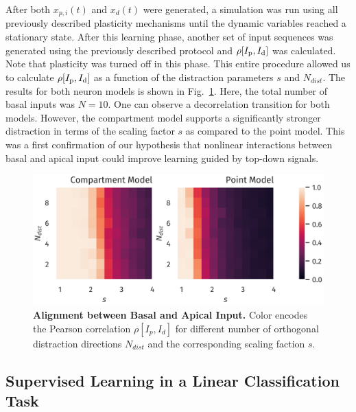 \documentclass[10pt,a4paper,twocolumn]{article}
\begin{document}
		After both $x_{p,i}(t)$ and $x_d(t)$ were generated,
		a simulation was run using all previously described plasticity
		mechanisms until the dynamic variables reached a stationary state.
		After this learning phase, another set of input sequences was generated
		using the previously described protocol and $\rho[I_{\rm p},I_{\rm d}]$ was calculated.
		Note that plasticity was turned off in this phase. This entire procedure
		allowed us to calculate $\rho[I_{\rm p},I_{\rm d}]$ as a function of the distraction
		parameters $s$ and $N_{dist}$. The results for both neuron models 
		is shown in Fig.~\ref{fig:corr_dimension_scaling}. Here, the total number of 
		basal inputs was $N=10$. One can observe a decorrelation transition for 
		both models. However, the compartment model supports a significantly stronger
		distraction in terms of the scaling factor $s$ as compared to the point model.
		This was a first confirmation of our hypothesis that nonlinear interactions
		between basal and apical input could improve learning guided by top-down signals.
		
		\begin{figure}
			\includegraphics[width=\columnwidth]{corr_dimension_scaling}
			\caption{{\bf Alignment between Basal and Apical Input.} Color
			encodes the Pearson correlation $\rho[I_p,I_d]$ for different
			number of orthogonal distraction directions $N_{dist}$ 
			and the corresponding scaling faction $s$.}
			\label{fig:corr_dimension_scaling}
		\end{figure}
		
		\subsection{Supervised Learning in a Linear Classification Task}
		
\end{document}
